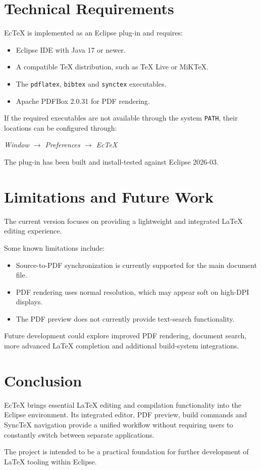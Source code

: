 \documentclass[11pt,a4paper]{article}
\begin{document}
\section{Technical Requirements}

EcTeX is implemented as an Eclipse plug-in and requires:

\begin{itemize}[noitemsep]
    \item Eclipse IDE with Java 17 or newer.
    \item A compatible TeX distribution, such as TeX Live
    or MiKTeX.
    \item The \texttt{pdflatex}, \texttt{bibtex} and
    \texttt{synctex} executables.
    \item Apache PDFBox 2.0.31 for PDF rendering.
\end{itemize}

If the required executables are not available through
the system \texttt{PATH}, their locations can be
configured through:

\begin{center}
\textit{Window $\rightarrow$ Preferences $\rightarrow$ EcTeX}
\end{center}

The plug-in has been built and install-tested against
Eclipse 2026-03.

\section{Limitations and Future Work}

The current version focuses on providing a lightweight
and integrated LaTeX editing experience.

Some known limitations include:

\begin{itemize}[noitemsep]
    \item Source-to-PDF synchronization is currently
    supported for the main document file.
    \item PDF rendering uses normal resolution, which
    may appear soft on high-DPI displays.
    \item The PDF preview does not currently provide
    text-search functionality.
\end{itemize}

Future development could explore improved PDF rendering,
document search, more advanced LaTeX completion and
additional build-system integrations.

\section{Conclusion}

EcTeX brings essential LaTeX editing and compilation
functionality into the Eclipse environment. Its integrated
editor, PDF preview, build commands and SyncTeX navigation
provide a unified workflow without requiring users to
constantly switch between separate applications.

The project is intended to be a practical foundation
for further development of LaTeX tooling within Eclipse.



\end{document}
